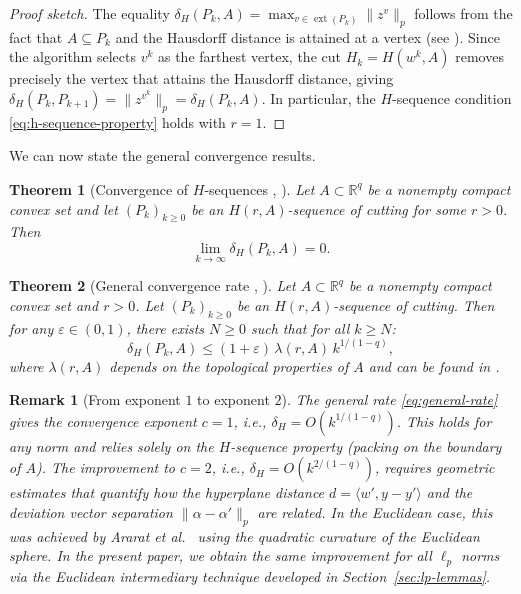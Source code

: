 \documentclass[11pt]{article}
\newtheorem{theorem}{Theorem}
\newtheorem{remark}{Remark}
\newcommand{\R}{\mathbb{R}}
\DeclareMathOperator{\ext}{ext}
\begin{document}
\begin{proof}[Proof sketch]
The equality $\delta_H(P_k, A) = \max_{v \in \ext(P_k)} \|z^v\|_p$ follows from the fact that $A \subseteq P_k$ and the Hausdorff distance is attained at a vertex (see \cite[Lemma~5.3]{Ararat2022}). Since the algorithm selects $v^k$ as the farthest vertex, the cut $H_k = H(w^k, A)$ removes precisely the vertex that attains the Hausdorff distance, giving $\delta_H(P_k, P_{k+1}) = \|z^{v^k}\|_p = \delta_H(P_k, A)$. In particular, the $H$-sequence condition \eqref{eq:h-sequence-property} holds with $r = 1$.
\end{proof}

We can now state the general convergence results.

\begin{theorem}[Convergence of $H$-sequences {\cite[Theorem~8.5]{Lotov2004}, \cite[Theorem~6.6]{Ararat2024}}]\label{thm:h-convergence}
Let $A \subset \R^q$ be a nonempty compact convex set and let $(P_k)_{k \ge 0}$ be an $H(r, A)$-sequence of cutting for some $r > 0$. Then
\[
\lim_{k \to \infty} \delta_H(P_k, A) = 0.
\]
\end{theorem}

\begin{theorem}[General convergence rate {\cite[Theorem~8.6]{Lotov2004}, \cite[Theorem~6.9]{Ararat2024}}]\label{thm:general-rate}
Let $A \subset \R^q$ be a nonempty compact convex set and $r > 0$. Let $(P_k)_{k \ge 0}$ be an $H(r, A)$-sequence of cutting. Then for any $\varepsilon \in (0, 1)$, there exists $N \ge 0$ such that for all $k \ge N$:
\begin{equation}\label{eq:general-rate}
\delta_H(P_k, A) \le (1 + \varepsilon)\,\lambda(r, A)\, k^{1/(1-q)},
\end{equation}
where $\lambda(r, A)$ depends on the topological properties of $A$ and can be found in \cite[Theorem~2]{Kamenev1992}.
\end{theorem}

\begin{remark}[From exponent $1$ to exponent $2$]\label{rem:exponent-jump}
The general rate \eqref{eq:general-rate} gives the convergence exponent $c = 1$, i.e., $\delta_H = O(k^{1/(1-q)})$. This holds for \emph{any} norm and relies solely on the $H$-sequence property (packing on the boundary of $A$). The improvement to $c = 2$, i.e., $\delta_H = O(k^{2/(1-q)})$, requires \emph{geometric estimates} that quantify how the hyperplane distance $d = \langle w', y - y' \rangle$ and the deviation vector separation $\|\alpha - \alpha'\|_p$ are related. In the Euclidean case, this was achieved by Ararat et al.\ \cite[Section~7]{Ararat2024} using the quadratic curvature of the Euclidean sphere. In the present paper, we obtain the same improvement for all $\ell_p$ norms via the Euclidean intermediary technique developed in Section~\ref{sec:lp-lemmas}.
\end{remark}
\end{document}
